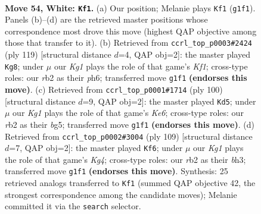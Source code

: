 \documentclass[11pt]{article}
\begin{document}
\clearpage

\begin{figure}[p]\centering
\begin{subfigure}{0.46\textwidth}\centering
\resizebox{\linewidth}{!}{%
\newchessgame
\chessboard[
  setfen={2k5/8/8/4p1p1/5p2/5B2/1r6/6K1 w - - 19 54},
  showmover=false,
  pgfstyle=straightmove, color=movearrow, markmove={g1-f1}
]}
\caption{}
\end{subfigure}\hfill
\begin{subfigure}{0.46\textwidth}\centering
\resizebox{\linewidth}{!}{%
\newchessgame
\chessboard[
  setfen={5k2/8/4K2P/6P1/5P2/8/1b6/8 b - - 0 60},
  showmover=false,
  pgfstyle=straightmove, color=movearrow, markmove={f8-g8}
]}
\caption{}
\end{subfigure}
\\[4pt]
\begin{subfigure}{0.46\textwidth}\centering
\resizebox{\linewidth}{!}{%
\newchessgame
\chessboard[
  setfen={8/7k/4K3/1p4b1/2pB4/8/8/8 w - - 6 51},
  showmover=false,
  pgfstyle=straightmove, color=movearrow, markmove={e6-d5}
]}
\caption{}
\end{subfigure}\hfill
\begin{subfigure}{0.46\textwidth}\centering
\resizebox{\linewidth}{!}{%
\newchessgame
\chessboard[
  setfen={8/8/1b1p4/1P1P2k1/2P5/5K1B/8/8 b - - 0 55},
  showmover=false,
  pgfstyle=straightmove, color=movearrow, markmove={g5-f6}
]}
\caption{}
\end{subfigure}
\caption{\textbf{Move 54, White: \texttt{Kf1}.} (a) Our position; Melanie plays \texttt{Kf1} (\texttt{g1f1}). Panels (b)--(d) are the retrieved master positions whose correspondence most drove this move (highest QAP objective among those that transfer to it). (b) Retrieved from \texttt{ccrl\_top\_p0003\#2424} (ply 119) [structural distance $d$=4, QAP obj=2]: the master played \texttt{Kg8}; under $\mu$ our \emph{Kg1} plays the role of that game's \emph{Kf1}; cross-type roles: our \emph{r}b2 as their \emph{p}h6; transferred move \texttt{g1f1} \textbf{(endorses this move)}. (c) Retrieved from \texttt{ccrl\_top\_p0001\#1714} (ply 100) [structural distance $d$=9, QAP obj=2]: the master played \texttt{Kd5}; under $\mu$ our \emph{Kg1} plays the role of that game's \emph{Ke6}; cross-type roles: our \emph{r}b2 as their \emph{b}g5; transferred move \texttt{g1f1} \textbf{(endorses this move)}. (d) Retrieved from \texttt{ccrl\_top\_p0002\#3004} (ply 109) [structural distance $d$=7, QAP obj=2]: the master played \texttt{Kf6}; under $\mu$ our \emph{Kg1} plays the role of that game's \emph{Kg4}; cross-type roles: our \emph{r}b2 as their \emph{b}h3; transferred move \texttt{g1f1} \textbf{(endorses this move)}. Synthesis: 25 retrieved analogs transferred to \texttt{Kf1} (summed QAP objective 42, the strongest correspondence among the candidate moves); Melanie committed it via the \texttt{search} selector.}
\label{fig:thought-m106}
\end{figure}
\end{document}
